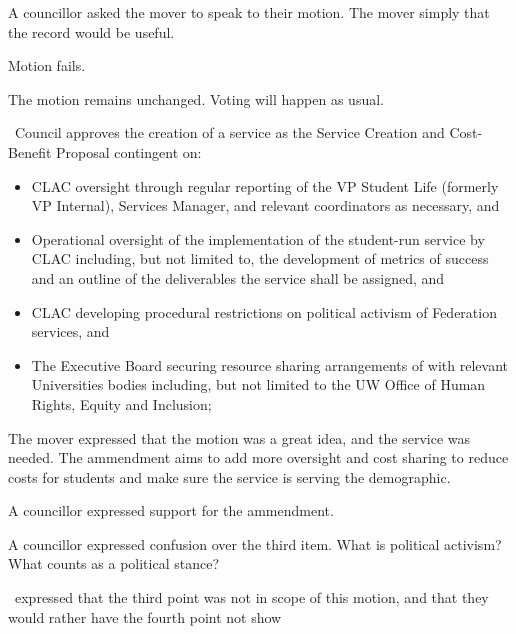 \begin{motion}
\begin{motion}
        A councillor asked the mover to speak to their motion. The mover simply
        that the record would be useful.

        Motion fails.
    \end{motion}

    The motion remains unchanged. Voting will happen as usual.

    \begin{motion}
        \birt\ Council approves the creation of a service as the Service Creation
        and Cost-Benefit Proposal contingent on:

        \begin{itemize}
            \item CLAC oversight through regular reporting of the VP Student
                Life (formerly VP Internal), Services Manager, and relevant
                coordinators as necessary, and 

            \item Operational oversight of the implementation of the
                student-run service by CLAC including, but not limited to, the
                development of metrics of success and an outline of the
                deliverables the service shall be assigned, and

            \item CLAC developing procedural restrictions on political
                activism of Federation services, and

            \item The Executive Board securing resource sharing
                arrangements of with relevant Universities bodies
                including, but not limited to the UW Office of Human
                Rights, Equity and Inclusion;
        \end{itemize}
        \movers{\seneca}{\alexander}

        The mover expressed that the motion was a great idea, and the service was
        needed. The ammendment aims to add more oversight and cost sharing to 
        reduce costs for students and make sure the service is serving the 
        demographic.

        A councillor expressed support for the ammendment.

        A councillor expressed confusion over the third item. What is political
        activism? What counts as a political stance?

        \katie\ expressed that the third point was not in scope of this motion,
        and that they would rather have the fourth point not show 


\end{motion}
\end{motion}
